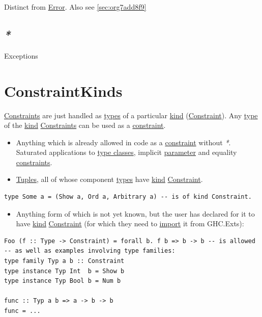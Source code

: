 \documentclass[a4paper,14pt,oneside]{book}
\begin{document}
Distinct from \hyperref[orgdc691d6]{Error}. Also see \ref{sec:org7add8f9}

\section{\emph{*}}
\label{sec:org1660f68}

\label{org45b1514}Exceptions

\chapter{\label{org8011c7b}ConstraintKinds}
\label{sec:org7c8e17e}
\hyperref[org5510d2c]{Constraints} are just handled as \hyperref[org1a01f44]{types} of a particular \hyperref[org2dfef25]{kind} (\hyperref[org51e4a22]{Constraint}).
Any \hyperref[orgccb4bd0]{type} of the \hyperref[org2dfef25]{kind} \hyperref[org5510d2c]{Constraints} can be used as a \hyperref[org51e4a22]{constraint}.
\begin{itemize}
\item Anything which is already allowed in code as a \hyperref[org51e4a22]{constraint} without \emph{*}. Saturated applications to \hyperref[orgf28fdd5]{type classes}, implicit \hyperref[orgc7bfa61]{parameter} and equality \hyperref[org5510d2c]{constraints}.
\item \hyperref[orge519b34]{Tuples}, all of whose component \hyperref[org1a01f44]{types} have \hyperref[org2dfef25]{kind} \hyperref[org51e4a22]{Constraint}.
\end{itemize}
\begin{verbatim}
type Some a = (Show a, Ord a, Arbitrary a) -- is of kind Constraint.
\end{verbatim}
\begin{itemize}
\item Anything form of which is not yet known, but the user has declared for it to have \hyperref[org2dfef25]{kind} \hyperref[org51e4a22]{Constraint} (for which they need to \hyperref[org8fc2b05]{import} it from GHC.Exts):
\end{itemize}
\begin{verbatim}
Foo (f :: Type -> Constraint) = forall b. f b => b -> b -- is allowed
-- as well as examples involving type families:
type family Typ a b :: Constraint
type instance Typ Int  b = Show b
type instance Typ Bool b = Num b

func :: Typ a b => a -> b -> b
func = ...
\end{verbatim}
\end{document}

